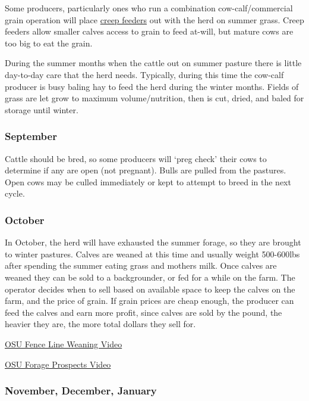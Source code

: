 \documentclass[
]{book}
\begin{document}
Some producers, particularly ones who run a combination cow-calf/commercial grain operation will place \href{https://www.google.com/search?q=creep+feeder\&espv=2\&biw=1920\&bih=1075\&source=lnms\&tbm=isch\&sa=X\&ved=0CAcQ_AUoAmoVChMI18ne2paTyQIVSJUeCh3eMw5X}{creep feeders} out with the herd on summer grass. Creep feeders allow smaller calves access to grain to feed at-will, but mature cows are too big to eat the grain.

During the summer months when the cattle out on summer pasture there is little day-to-day care that the herd needs. Typically, during this time the cow-calf producer is busy baling hay to feed the herd during the winter months. Fields of grass are let grow to maximum volume/nutrition, then is cut, dried, and baled for storage until winter.

\hypertarget{september}{%
\subsubsection{September}\label{september}}

Cattle should be bred, so some producers will `preg check' their cows to determine if any are open (not pregnant). Bulls are pulled from the pastures. Open cows may be culled immediately or kept to attempt to breed in the next cycle.

\hypertarget{october}{%
\subsubsection{October}\label{october}}

In October, the herd will have exhausted the summer forage, so they are brought to winter pastures. Calves are weaned at this time and usually weight 500-600lbs after spending the summer eating grass and mothers milk. Once calves are weaned they can be sold to a backgrounder, or fed for a while on the farm. The operator decides when to sell based on available space to keep the calves on the farm, and the price of grain. If grain prices are cheap enough, the producer can feed the calves and earn more profit, since calves are sold by the pound, the heavier they are, the more total dollars they sell for.

\href{https://www.youtube.com/watch?v=qpGuOOA-fYU}{OSU Fence Line Weaning Video}

\href{https://www.youtube.com/watch?v=JyvTl9PVdMQ\#action=share}{OSU Forage Prospects Video}

\hypertarget{november-december-january}{%
\subsubsection{November, December, January}\label{november-december-january}}
\end{document}
